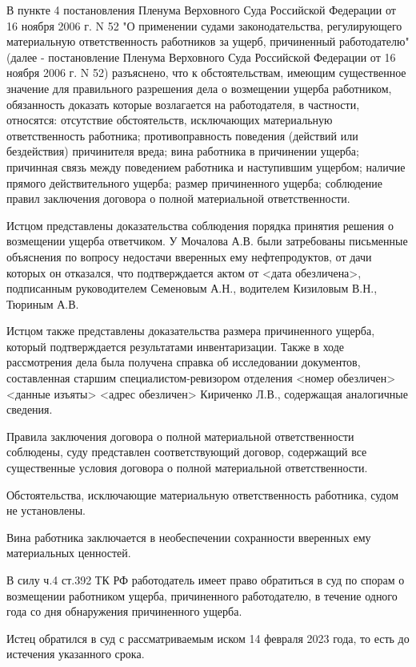 \documentclass[a4paper]{article}
\begin{document}
		В пункте 4 постановления Пленума Верховного Суда Российской Федерации от 16 ноября 2006 г. N 52 "О применении судами законодательства, регулирующего материальную ответственность работников за ущерб, причиненный работодателю" (далее - постановление Пленума Верховного Суда Российской Федерации от 16 ноября 2006 г. N 52) разъяснено, что к обстоятельствам, имеющим существенное значение для правильного разрешения дела о возмещении ущерба работником, обязанность доказать которые возлагается на работодателя, в частности, относятся: отсутствие обстоятельств, исключающих материальную ответственность работника; противоправность поведения (действий или бездействия) причинителя вреда; вина работника в причинении ущерба; причинная связь между поведением работника и наступившим ущербом; наличие прямого действительного ущерба; размер причиненного ущерба; соблюдение правил заключения договора о полной материальной ответственности.
		
		Истцом представлены доказательства соблюдения порядка принятия решения о возмещении ущерба ответчиком. У Мочалова А.В. были затребованы письменные объяснения по вопросу недостачи вверенных ему нефтепродуктов, от дачи которых он отказался, что подтверждается актом от <дата обезличена>, подписанным руководителем Семеновым А.Н., водителем Кизиловым В.Н., Тюриным А.В.
		
		Истцом также представлены доказательства размера причиненного ущерба, который подтверждается результатами инвентаризации. Также в ходе рассмотрения дела была получена справка об исследовании документов, составленная старшим специалистом-ревизором отделения <номер обезличен> <данные изъяты> <адрес обезличен> Кириченко Л.В., содержащая аналогичные сведения.
		
		Правила заключения договора о полной материальной ответственности соблюдены, суду представлен соответствующий договор, содержащий все существенные условия договора о полной материальной ответственности.
		
		Обстоятельства, исключающие материальную ответственность работника, судом не установлены.
		
		Вина работника заключается в необеспечении сохранности вверенных ему материальных ценностей.
		
		В силу ч.4 ст.392 ТК РФ работодатель имеет право обратиться в суд по спорам о возмещении работником ущерба, причиненного работодателю, в течение одного года со дня обнаружения причиненного ущерба.
		
		Истец обратился в суд с рассматриваемым иском 14 февраля 2023 года, то есть до истечения указанного срока.
		
\end{document}
